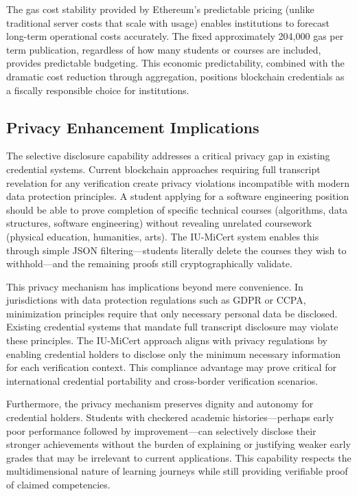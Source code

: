 The gas cost stability provided by Ethereum's predictable pricing (unlike traditional server costs that scale with usage) enables institutions to forecast long-term operational costs accurately. The fixed approximately 204,000 gas per term publication, regardless of how many students or courses are included, provides predictable budgeting. This economic predictability, combined with the dramatic cost reduction through aggregation, positions blockchain credentials as a fiscally responsible choice for institutions.

\subsection{Privacy Enhancement Implications}
\label{subsec:privacy-implications}

The selective disclosure capability addresses a critical privacy gap in existing credential systems. Current blockchain approaches requiring full transcript revelation for any verification create privacy violations incompatible with modern data protection principles. A student applying for a software engineering position should be able to prove completion of specific technical courses (algorithms, data structures, software engineering) without revealing unrelated coursework (physical education, humanities, arts). The IU-MiCert system enables this through simple JSON filtering—students literally delete the courses they wish to withhold—and the remaining proofs still cryptographically validate.

This privacy mechanism has implications beyond mere convenience. In jurisdictions with data protection regulations such as GDPR or CCPA, minimization principles require that only necessary personal data be disclosed. Existing credential systems that mandate full transcript disclosure may violate these principles. The IU-MiCert approach aligns with privacy regulations by enabling credential holders to disclose only the minimum necessary information for each verification context. This compliance advantage may prove critical for international credential portability and cross-border verification scenarios.

Furthermore, the privacy mechanism preserves dignity and autonomy for credential holders. Students with checkered academic histories—perhaps early poor performance followed by improvement—can selectively disclose their stronger achievements without the burden of explaining or justifying weaker early grades that may be irrelevant to current applications. This capability respects the multidimensional nature of learning journeys while still providing verifiable proof of claimed competencies.

